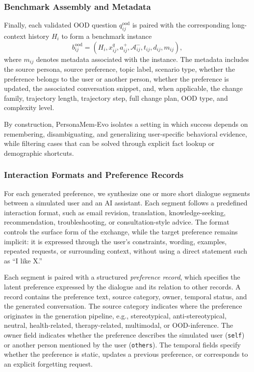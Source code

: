 \documentclass{llmxive}
\begin{document}
\subsubsection{Benchmark Assembly and Metadata}
\label{app:persona_metadata}
Finally, each validated OOD question $q_{ij}^{\mathrm{ood}}$ is paired with the corresponding long-context history $H_i$ to form a benchmark instance
\[
b_{ij}^{\mathrm{ood}}
=
\left(
H_i,
x_{ij}^{q},
a_{ij}^{+},
\mathcal{A}_{ij}^{-},
t_{ij},
d_{ij},
m_{ij}
\right),
\]
where $m_{ij}$ denotes metadata associated with the instance. The metadata includes the source persona, source preference, topic label, scenario type, whether the preference belongs to the user or another person, whether the preference is updated, the associated conversation snippet, and, when applicable, the change family, trajectory length, trajectory step, full change plan, OOD type, and complexity level.

By construction, PersonaMem-Evo isolates a setting in which success depends on remembering, disambiguating, and generalizing user-specific behavioral evidence, while filtering cases that can be solved through explicit fact lookup or demographic shortcuts.








\subsubsection{Interaction Formats and Preference Records}
\label{app:persona_inter_format}

For each generated preference, we synthesize one or more short dialogue segments between a simulated user and an AI assistant. Each segment follows a predefined interaction format, such as email revision, translation, knowledge-seeking, recommendation, troubleshooting, or consultation-style advice. The format controls the surface form of the exchange, while the target preference remains implicit: it is expressed through the user's constraints, wording, examples, repeated requests, or surrounding context, without using a direct statement such as ``I like X.''

Each segment is paired with a structured \emph{preference record}, which specifies the latent preference expressed by the dialogue and its relation to other records. A record contains the preference text, source category, owner, temporal status, and the generated conversation. The source category indicates where the preference originates in the generation pipeline, e.g., stereotypical, anti-stereotypical, neutral, health-related, therapy-related, multimodal, or OOD-inference. The owner field indicates whether the preference describes the simulated user (\texttt{self}) or another person mentioned by the user (\texttt{others}). The temporal fields specify whether the preference is static, updates a previous preference, or corresponds to an explicit forgetting request.
\end{document}
